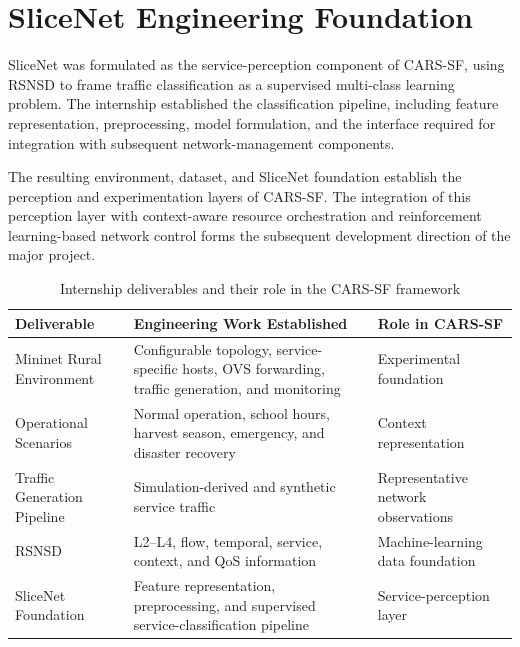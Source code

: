 \documentclass[12pt,a4paper]{report}
\begin{document}
	
	\section{SliceNet Engineering Foundation}
	\label{sec:slicenet_foundation}
	
	SliceNet was formulated as the service-perception component of
	CARS-SF, using RSNSD to frame traffic classification as a supervised
	multi-class learning problem. The internship established the
	classification pipeline, including feature representation,
	preprocessing, model formulation, and the interface required for
	integration with subsequent network-management components.
	
	The resulting environment, dataset, and SliceNet foundation establish
	the perception and experimentation layers of CARS-SF. The integration
	of this perception layer with context-aware resource orchestration and
	reinforcement learning-based network control forms the subsequent
	development direction of the major project.
	
	\begin{table}[H]
		\centering
		\caption{Internship deliverables and their role in the CARS-SF framework}
		\label{tab:internship_dod}
		\begin{tabular}{p{3.2cm} p{5.2cm} p{4.0cm}}
			\toprule
			\textbf{Deliverable} &
			\textbf{Engineering Work Established} &
			\textbf{Role in CARS-SF} \\
			\midrule
			
			Mininet Rural Environment &
			Configurable topology, service-specific hosts, OVS forwarding,
			traffic generation, and monitoring &
			Experimental foundation \\
			
			Operational Scenarios &
			Normal operation, school hours, harvest season, emergency, and
			disaster recovery &
			Context representation \\
			
			Traffic Generation Pipeline &
			Simulation-derived and synthetic service traffic &
			Representative network observations \\
			
			RSNSD &
			L2--L4, flow, temporal, service, context, and QoS information &
			Machine-learning data foundation \\
			
			SliceNet Foundation &
			Feature representation, preprocessing, and supervised
			service-classification pipeline &
			Service-perception layer \\
			
			\bottomrule
		\end{tabular}
	\end{table}
\end{document}
